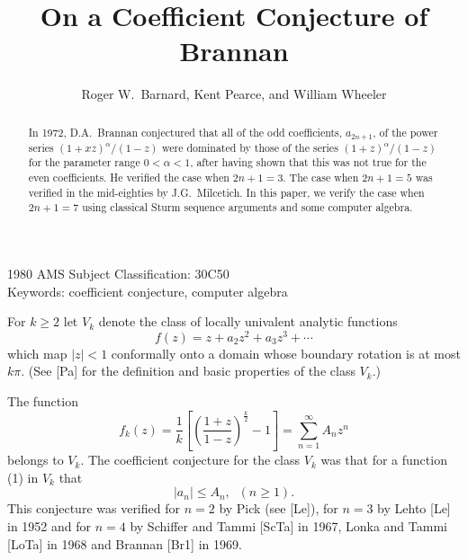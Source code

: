 \newcommand\eref[1]{(\ref{#1})}
\def\a{\alpha}
\def\d{\delta}
\def\i{\infty}
\def\t{\theta}



\title{On a Coefficient Conjecture of Brannan}
\author{Roger W.\ Barnard, Kent Pearce, and William Wheeler}
\date{}
\maketitle

\begin{abstract}
In 1972, D.A.\ Brannan conjectured that all of the odd coefficients,
$a_{2n+1}$, of the power series $(1+xz)^\a/(1-z)$ were dominated by
those of the series $(1+z)^\a/(1-z)$ for the parameter range
$0<\a<1$, after having shown that this was not true for the even
coefficients.  He verified the case when $2n+1=3$.  The case when
$2n+1=5$ was verified in the mid-eighties by J.G.\ Milcetich.  In
this paper, we verify the case when $2n+1=7$ using classical Sturm
sequence arguments and some computer algebra.
\end{abstract}

1980 AMS Subject Classification: 30C50\\

Keywords: coefficient conjecture, computer algebra

\newpage

\baselineskip=18pt


For $k\geq 2$ let $V_k$ denote the class of locally univalent
analytic functions
\begin{equation}
\label{1}
f(z)=z+a_2z^2+a_3z^3+\cdots
\end{equation}
which map $|z|<1$ conformally onto a domain whose boundary rotation is
at most $k\pi$.  (See [Pa] for the definition and basic properties of
the class $V_k$.)

The function
$$
f_k(z)=\frac{1}{k}\left[\left(\frac{1+z}{1-z}\right)^{\frac{k}{2}}
-1\right]=\sum^\i_{n=1}A_nz^n
$$
belongs to $V_k$.  The coefficient conjecture for the class $V_k$ was
that for a function (1) in $V_k$ that
\begin{equation}
\label{2}
|a_n|\leq A_n,\;\; (n\geq 1).
\end{equation}
This conjecture was verified for $n=2$ by Pick (see [Le]), for $n=3$
by Lehto [Le] in 1952 and for $n=4$ by Schiffer and Tammi [ScTa] in
1967, Lonka and Tammi [LoTa] in 1968 and Brannan [Br1] in 1969.

